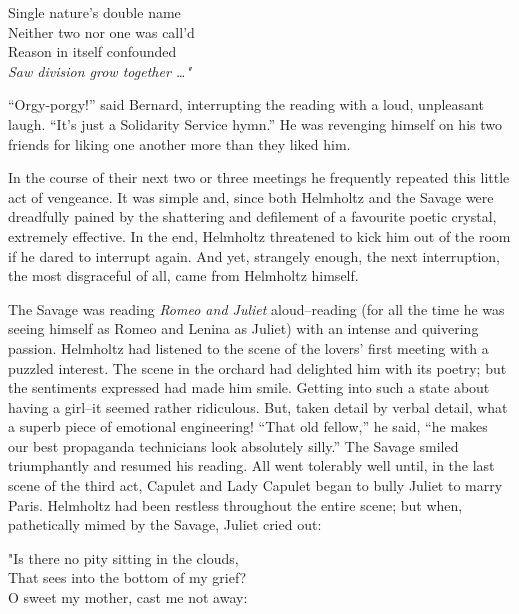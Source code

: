 \documentclass[12pt]{report}
\begin{document}
Single nature's double name\\

Neither two nor one was call'd\\

Reason in itself confounded\\

\emph{Saw division grow together \ldots{}"\\
}

``Orgy-porgy!'' said Bernard, interrupting the reading with a loud,
unpleasant laugh. ``It's just a Solidarity Service hymn.'' He was
revenging himself on his two friends for liking one another more than
they liked him.

In the course of their next two or three meetings he frequently repeated
this little act of vengeance. It was simple and, since both Helmholtz
and the Savage were dreadfully pained by the shattering and defilement
of a favourite poetic crystal, extremely effective. In the end,
Helmholtz threatened to kick him out of the room if he dared to
interrupt again. And yet, strangely enough, the next interruption, the
most disgraceful of all, came from Helmholtz himself.

The Savage was reading \emph{Romeo and Juliet} aloud--reading (for all
the time he was seeing himself as Romeo and Lenina as Juliet) with an
intense and quivering passion. Helmholtz had listened to the scene of
the lovers' first meeting with a puzzled interest. The scene in the
orchard had delighted him with its poetry; but the sentiments expressed
had made him smile. Getting into such a state about having a girl--it
seemed rather ridiculous. But, taken detail by verbal detail, what a
superb piece of emotional engineering! ``That old fellow,'' he said,
``he makes our best propaganda technicians look absolutely silly.'' The
Savage smiled triumphantly and resumed his reading. All went tolerably
well until, in the last scene of the third act, Capulet and Lady Capulet
began to bully Juliet to marry Paris. Helmholtz had been restless
throughout the entire scene; but when, pathetically mimed by the Savage,
Juliet cried out:

\emph{}

"Is there no pity sitting in the clouds,\\

That sees into the bottom of my grief?\\

O sweet my mother, cast me not away:\\
\end{document}
